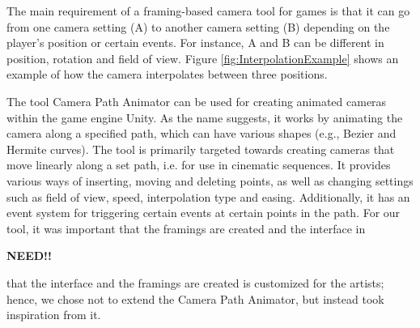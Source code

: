 The main requirement of a framing-based camera tool for games is that it can go from one camera setting (A) to another camera setting (B) depending on the player's position or certain events. For instance, A and B can be different in position, rotation and field of view.
Figure \ref{fig:InterpolationExample} shows an example of how the camera interpolates between three positions.


The tool Camera Path Animator \cite{unity_camTool} can be used for creating animated cameras within the game engine Unity. As the name suggests, it works by animating the camera along a specified path, which can have various shapes (e.g., Bezier and Hermite curves). The tool is primarily targeted towards creating cameras that move linearly along a set path, i.e. for use in cinematic sequences. It provides various ways of inserting, moving and deleting points, as well as changing settings such as field of view, speed, interpolation type and easing. Additionally, it has an event system for triggering certain events at certain points in the path. For our tool, it was important that the framings are created and the interface in

\textbf{NEED!!}


that the interface and the framings are created is customized for the artists; hence, we chose not to extend the Camera Path Animator, but instead took inspiration from it.



